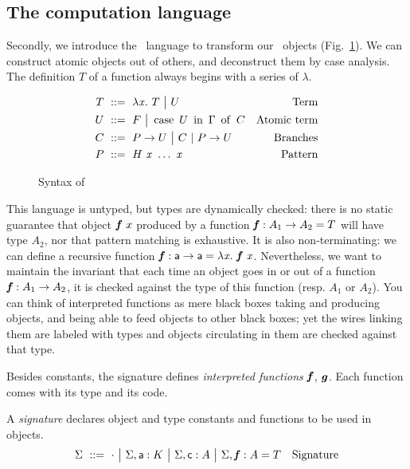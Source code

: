 \documentclass{llncs}
\begin{document}
\subsection{The computation language}
\label{sec:comput}

Secondly, we introduce the \CL\ language to transform our \SLF\
objects (Fig.~\ref{fig:syntax-CL}). We can construct atomic objects
out of others, and deconstruct them by case analysis. The definition
$T$ of a function always begins with a series of $\lambda$.

\begin{figure}[t]
  \begin{align*}
    T &\ ::=\  \lambda{\ensuremath{\text{\textit{x}}}}.\  T \ {\big|}\ 
    U & \text{Term} \\
    U &\ ::=\  F \ {\big|}\ 
    \operatorname{case}\ {{U}\ \operatorname{in}\ {\Gamma}}\ \operatorname{of}\  C & \text{Atomic term}\\
    C &\ ::=\  {P}\to U \ {\big|}\ 
    C\ |\ {P}\to U & \text{Branches}\\
    P &\ ::=\  {H}\  {\text{\textit{x}}}\ \ldots\ {\text{\textit{x}}} &\text{Pattern}
  \end{align*}
  \caption{Syntax of \CL}
\label{fig:syntax-CL}
\end{figure}

This language is untyped, but types are dynamically checked: there is
no static guarantee that object ${\text{\textit{\textbf{f}}}}\  x$ produced by a
function $\text{\textit{\textbf{f}}} : A_1\to A_2 = T$ will have type $A_2$, nor that
pattern matching is exhaustive. It is also non-terminating: we can
define a recursive function $\text{\textit{\textbf{f}}} : \text{\textsf{a}}\to \text{\textsf{a}} = \lambda{\ensuremath{\text{\textit{x}}}}.\  {\text{\textit{\textbf{f}}}}\  {\text{\textit{x}}}$. Nevertheless, we want to maintain the invariant
that each time an object goes in or out of a function $\text{\textit{\textbf{f}}} : A_1\to
A_2$, it is checked against the type of this function (resp. $A_1$ or
$A_2$). You can think of interpreted functions as mere black boxes
taking and producing objects, and being able to feed objects to other
black boxes; yet the wires linking them are labeled with types and
objects circulating in them are checked against that type.

Besides constants, the signature defines \emph{interpreted functions}
$\text{\textit{\textbf{f}}}$, $\text{\textit{\textbf{g}}}$. Each function comes with its type and its
code. 

\begin{definition}
  A \emph{signature} declares object and type constants and functions
  to be used in objects.
  \begin{align*}
    \Sigma &\ ::=\ 
    \cdot
    \ {\big|}\ 
    {\Sigma},{\text{\textsf{a}} : K}
    \ {\big|}\ 
    {\Sigma},{\text{\textsf{c}} : A}
    \ {\big|}\ 
    {\Sigma},{\text{\textit{\textbf{f}}} : A = T}
    &\text{Signature}
  \end{align*}
\end{definition}
\end{document}
